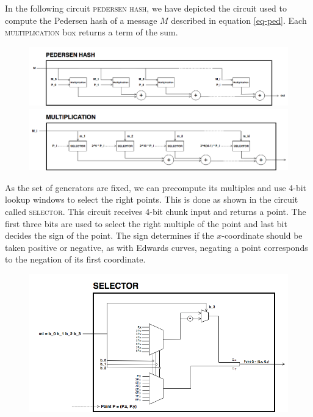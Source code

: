 In the following circuit \textsc{pedersen hash}, we have depicted the circuit used to compute the Pedersen hash of a message $M$ described in equation \ref{eq-ped}. Each \textsc{multiplication} box returns a term of the sum. 

\begin{figure}[h]
	\centering
	\includegraphics[scale=0.4]{figures/pedersen-hash.png}
	\includegraphics[scale=0.4]{figures/pedersen-multiplication.png}
\end{figure}

As the set of generators are fixed, we can precompute its multiples and use 4-bit lookup windows to select the right points. This is done as shown in the circuit called \textsc{selector}. This circuit receives 4-bit chunk input and returns a point. The first three bits are used to select the right multiple of the point and last bit decides the sign of the point. The sign determines if the $x$-coordinate should be taken positive or negative, as with Edwards curves, negating a point corresponds to the negation of its first coordinate. %

\begin{figure}[h]
	\centering
	\includegraphics[scale=0.5]{figures/pedersen-multiplication-selector.png}
\end{figure}

